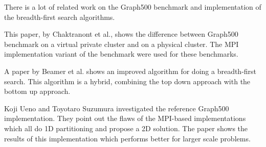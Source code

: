 There is a lot of related work on the Graph500 benchmark and implementation of the breadth-first search algorithms. 

This paper, by Chaktranont et al.\cite{chakthranont2014exploring}, shows the difference between Graph500 benchmark on a virtual private cluster and on a physical cluster. The MPI implementation variant of the benchmark were used for these benchmarks.

A paper by Beamer et al.\cite{beamer2011searching} shows an improved algorithm for doing a breadth-first search. This algorithm is a hybrid, combining the top down approach with the bottom up approach.

Koji Ueno and Toyotaro Suzumura\cite{ueno2012highly} investigated the reference Graph500 implementation. They point out the flaws of the MPI-based implementations which all do 1D partitioning and propose a 2D solution. The paper shows the results of this implementation which performs better for larger scale problems.